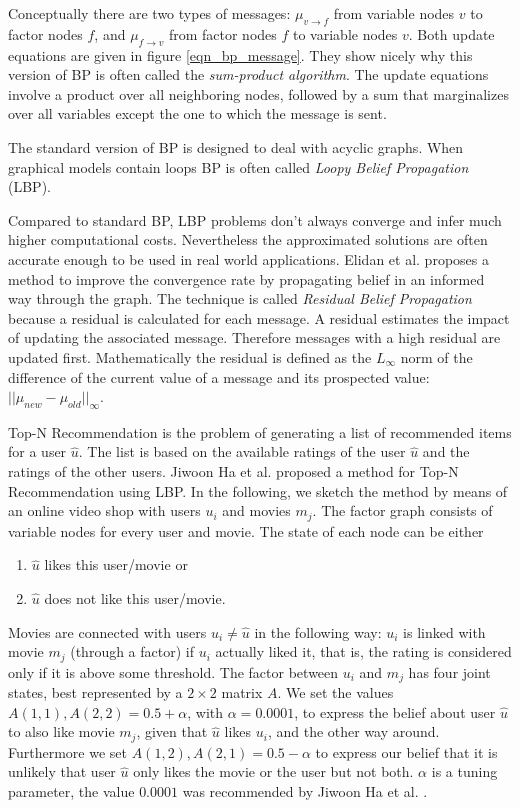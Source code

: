 Conceptually there are two types of messages: $\mu_{v\rightarrow f}$ from variable nodes $v$ to factor nodes $f$, and $\mu_{f\rightarrow v}$ from factor nodes $f$ to variable nodes $v$. Both update equations are given in figure \ref{eqn_bp_message}. They show nicely why this version of BP is often called the \textit{sum-product algorithm}. The update equations involve a product over all neighboring nodes, followed by a sum that marginalizes over all variables except the one to which the message is sent.

The standard version of BP is designed to deal with acyclic graphs. When graphical models contain loops BP is often called \textit{Loopy Belief Propagation} (LBP).

Compared to standard BP, LBP problems don't always converge and infer much higher computational costs. Nevertheless the approximated solutions are often accurate enough to be used in real world applications. Elidan et al. \cite{elidan2012residual} proposes a method to improve the convergence rate by propagating belief in an informed way through the graph. The technique is called \textit{Residual Belief Propagation} because a residual is calculated for each message. A residual estimates the impact of updating the associated message. Therefore messages with a high residual are updated first. Mathematically the residual is defined as the $L_\infty$ norm of the difference of the current value of a message and its prospected value: $||\mu_{new} - \mu_{old}||_\infty$.


Top-N Recommendation is the problem of generating a list of recommended items for a user $\hat u$. The list is based on the available ratings of the user $\hat u$ and the ratings of the other users. Jiwoon Ha et al. \cite{Ha:2012:TRT:2396761.2398636} proposed a method for Top-N Recommendation using LBP. In the following, we sketch the method by means of an online video shop with users $u_i$ and movies $m_j$. The factor graph consists of variable nodes for every user and movie. The state of each node can be either
\begin{enumerate}
   \itemsep0em 
   \item $\hat u$ likes this user/movie or
   \item $\hat u$ does not like this user/movie.
\end{enumerate}
Movies are connected with users $u_i\neq \hat u$ in the following way: $u_i$ is linked with movie $m_j$ (through a factor) if $u_i$ actually liked it, that is, the rating is considered only if it is above some threshold. The factor between $u_i$ and $m_j$ has four joint states, best represented by a $2\times 2$ matrix $A$. We set the values $A(1,1), A(2,2) = 0.5 + \alpha$, with $\alpha = 0.0001$, to express the belief about user $\hat u$ to also like movie $m_j$, given that $\hat u$ likes $u_i$, and the other way around. Furthermore we set $A(1,2), A(2,1) = 0.5 - \alpha$ to express our belief that it is unlikely that user $\hat u$ only likes the movie or the user but not both. $\alpha$ is a tuning parameter, the value $0.0001$ was recommended by Jiwoon Ha et al. \cite{Ha:2012:TRT:2396761.2398636}.

